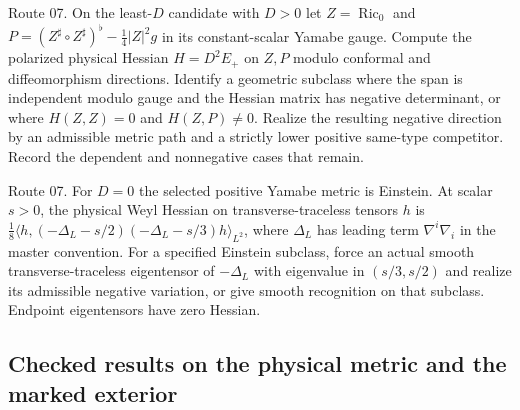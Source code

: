 \begin{openproblem}
\label{prob:ed06-polarized-hessian}
Route 07. On the least-$D$ candidate with $D>0$ let
$Z=\operatorname{Ric}_0$ and
$P=(Z^\sharp\circ Z^\sharp)^\flat-\tfrac14|Z|^2g$ in its
constant-scalar Yamabe gauge. Compute the polarized physical Hessian
$H=D^2E_+$ on $Z,P$ modulo conformal and diffeomorphism directions.
Identify a geometric subclass where the span is independent modulo
gauge and the Hessian matrix has negative determinant, or where
$H(Z,Z)=0$ and $H(Z,P)\ne0$. Realize the resulting negative direction
by an admissible metric path and a strictly lower positive same-type
competitor. Record the dependent and nonnegative cases that remain.
\end{openproblem}

\begin{openproblem}
\label{prob:ed06-tt-window}
Route 07. For $D=0$ the selected positive Yamabe metric is Einstein.
At scalar $s>0$, the physical Weyl Hessian on transverse-traceless
tensors $h$ is $\tfrac18\langle h,(-\Delta_L-s/2)(-\Delta_L-s/3)h\rangle_{L^2}$,
where $\Delta_L$ has leading term $\nabla^i\nabla_i$ in the master
convention. For a specified Einstein subclass, force an actual smooth
transverse-traceless eigentensor of $-\Delta_L$ with eigenvalue in
$(s/3,s/2)$ and realize its admissible negative variation, or give
smooth recognition on that subclass. Endpoint eigentensors have zero
Hessian.
\end{openproblem}

\subsection{Checked results on the physical metric and the marked exterior}

